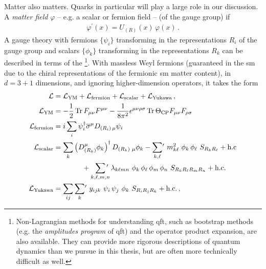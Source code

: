 Matter also matters.
%
Quarks in particular will play a large role in our discussion.
%
A \textit{matter field} \(\varphi\) -- e.g. a scalar or fermion field --  (of the gauge group) if
\begin{align}
    \varphi^\prime(x) = U_{(R)}(x) \, \varphi(x)
    \,.
\end{align}
%
A gauge theory with fermions \(\{\psi_{i}\}\) transforming in the representations \(R_i\) of the gauge group and scalars \(\{\phi_k\}\) transforming in the representations \(R_k\) can be described in terms of the %
\footnote{
    Non-Lagrangian methods for understanding \gls{qft}, such as bootstrap methods (e.g. the \textit{amplitudes program} of \gls{qft}) and the operator product expansion, are also available.
    They can provide more rigorous descriptions of quantum dynamics than we pursue in this thesis, but are often more technically difficult as well.
}.
%
With massless Weyl fermions (guaranteed in the \gls{sm} due to the chiral representations of the fermionic \gls{sm} matter content), in \(d=3+1\) dimensions, and ignoring higher-dimension operators, it takes the form
\begin{subequations}
    \label{eq:yang-mills-matter-lagrangian}
\begin{align}
    \mathcal{L}
    &=
    \mathcal{L}_\text{YM}
    +
    \mathcal{L}_\text{fermion}
    +
    \mathcal{L}_\text{scalar}
    +
    \mathcal{L}_\text{Yukawa}
    \,,
    \\
    \mathcal{L}_\text{YM}
    &=
    -
    \frac{1}{2} \Tr F_{\mu\nu} F^{\mu\nu}
    -
    \frac{1}{8 \pi^2}
    \epsilon^{\mu\nu\rho\sigma}
    \Tr
        \Theta_\text{CP}
        F_{\mu\nu}
        F_{\rho\sigma}
    \,
    \\
    \mathcal{L}_\text{fermion}
    &=
    i \sum_i \psi_i^\dagger \overline{\sigma}^\mu D_{(R_i)\,\mu} \psi_i
    \\
    \mathcal{L}_\text{scalar}
    &=
    \sum_k \left(D_{(R_k)}^\mu \phi_k\right)^\dagger D_{(R_k)\,\,\mu} \phi_k
    -
    \sum_{k,\ell} \! {}^\prime
    \,\,
    m_{k\ell}^2
    \,\,
    \phi_k \, \phi_\ell
    \,\,
    S_{R_k R_\ell}
    +
    \text{h.c}
    \\
    \notag
    &\qquad\qquad
    +
    \sum_{k,\ell,m,n} \!\!\!\! {}^\prime
    \,\,
    \lambda_{k\ell m n}
    \,\,
    \phi_k \, \phi_\ell \, \phi_m \, \phi_n
    \,\,
    S_{R_k R_\ell R_m R_n}
    +
    \text{h.c.}
    \\
    \mathcal{L}_\text{Yukawa}
    &=
    \sum_{ij}
    \sum_{k} \! {}^\prime
    \,\,
    y_{ijk}
    \,\,
    \psi_i \,\psi_j \,\, \phi_k
    \,\,
    S_{R_i R_j R_k}
    +
    \text{h.c.}
    \,,
\end{align}
\end{subequations}
